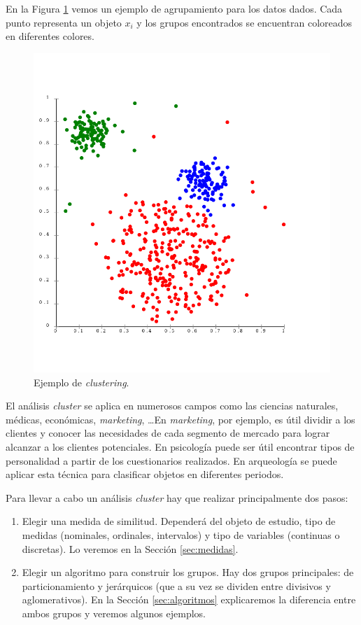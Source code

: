 \documentclass[a4paper, 20pt]{article}
\begin{document}
En la Figura \ref{fig:ejemplo} vemos un ejemplo de agrupamiento para los datos dados. Cada punto representa un objeto $x_i$ y los grupos encontrados se encuentran coloreados en diferentes colores.

\begin{figure}[H]
	\centering
	\includegraphics[scale=0.3]{ejemplo}
	\caption{Ejemplo de \textit{clustering}. \cite{chire_deutsch:_2011}}
	\label{fig:ejemplo}
\end{figure}

El análisis \textit{cluster} se aplica en numerosos campos como las ciencias naturales, médicas, económicas, \textit{marketing}, \dots En \textit{marketing}, por ejemplo, es útil dividir a los clientes y conocer las necesidades de cada segmento de mercado para lograr alcanzar a los clientes potenciales. En psicología puede ser útil encontrar tipos de personalidad a partir de los cuestionarios realizados. En arqueología se puede aplicar esta técnica para clasificar objetos en diferentes periodos.

Para llevar a cabo un análisis \textit{cluster} hay que realizar principalmente dos pasos:

\begin{enumerate}
\item Elegir una medida de similitud. Dependerá del objeto de estudio, tipo de medidas (nominales, ordinales, intervalos) y tipo de variables (continuas o discretas). Lo veremos en la Sección \ref{sec:medidas}.
\item Elegir un algoritmo para construir los grupos. Hay dos grupos principales: de particionamiento y jerárquicos (que a su vez se dividen entre divisivos y aglomerativos). En la Sección \ref{sec:algoritmos} explicaremos la diferencia entre ambos grupos y veremos algunos ejemplos.
\end{enumerate}
\end{document}
